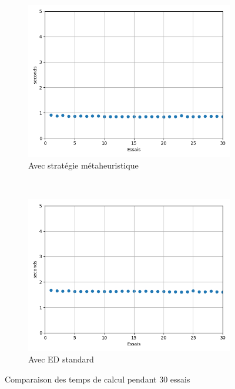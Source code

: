 \begin{figure}
    \centering
    \begin{subfigure}[b]{0.45\textwidth}
        \includegraphics[width=\textwidth]{resources/metaexec.png}
        \caption{Avec stratégie métaheuristique}
    \end{subfigure}
    ~
    \begin{subfigure}[b]{0.45\textwidth}
        \includegraphics[width=\textwidth]{resources/stdexec.png}
        \caption{Avec ED standard}
    \end{subfigure}
    \caption{Comparaison des temps de calcul pendant 30 essais}
    \label{fig:exectimes}
\end{figure}
